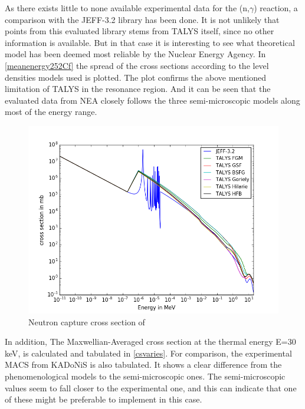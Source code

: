 \documentclass[a4paper,english]{article}
\begin{document}
As there exists little to none available experimental data for the (n,$\gamma$) reaction, a comparison with the JEFF-3.2 library has been done. It is not unlikely that points from this evaluated library stems from TALYS itself, since no other information is available. But in that case it is interesting to see what theoretical model has been deemed most reliable by the Nuclear Energy Agency.
In \autoref{meanenergy252Cf} the spread of the cross sections according to the level densities models used is plotted. The plot confirms the above mentioned limitation of TALYS in the resonance region. And it can be seen that the evaluated data from NEA closely follows the three semi-microscopic models along most of the energy range.
\begin{figure}[H]
  \centering
      \includegraphics[width=1\textwidth]{figure_1}
  \caption{Neutron capture cross section of }
  \label{meanenergy252Cf}
\end{figure}
In addition, The Maxwellian-Averaged cross section at the thermal energy E=30 keV, is calculated and tabulated in \autoref{csvaries}. For comparison, the experimental MACS from KADoNiS\cite{kadonis} is also tabulated. It shows a clear difference from the phenomenological models to the semi-microscopic ones. The semi-microscopic values seem to fall closer to the experimental one, and this can indicate that one of these might be preferable to implement in this case.
 
\end{document}

